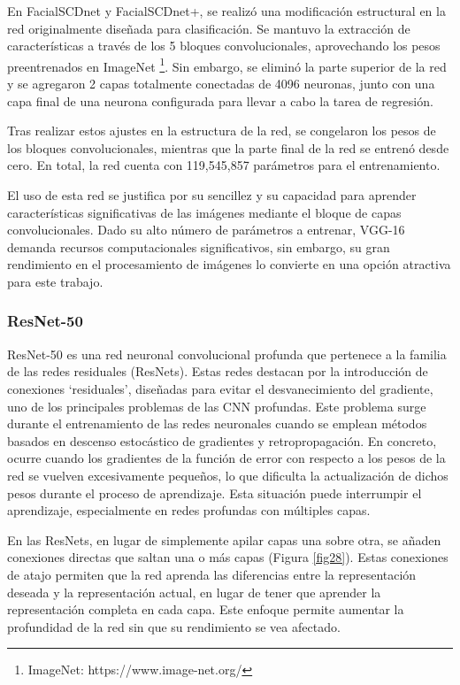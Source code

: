 En FacialSCDnet y FacialSCDnet+, se realizó una modificación estructural en la red originalmente diseñada para clasificación. Se mantuvo la extracción de características a través de los 5 bloques convolucionales, aprovechando los pesos preentrenados en ImageNet \footnote{ImageNet: https://www.image-net.org/}. Sin embargo, se eliminó la parte superior de la red y se agregaron 2 capas totalmente conectadas de 4096 neuronas, junto con una capa final de una neurona configurada para llevar a cabo la tarea de regresión.

Tras realizar estos ajustes en la estructura de la red, se congelaron los pesos de los bloques convolucionales, mientras que la parte final de la red se entrenó desde cero. En total, la red cuenta con 119,545,857 parámetros para el entrenamiento.

El uso de esta red se justifica por su sencillez y su capacidad para aprender características significativas de las imágenes mediante el bloque de capas convolucionales. Dado su alto número de parámetros a entrenar, VGG-16 demanda recursos computacionales significativos, sin embargo, su gran rendimiento en el procesamiento de imágenes lo convierte en una opción atractiva para este trabajo.

\subsubsection{ResNet-50}

ResNet-50 es una red neuronal convolucional profunda que pertenece a la familia de las redes residuales \cite{72} (ResNets). Estas redes destacan por la introducción de conexiones \enquote*{residuales}, diseñadas para evitar el desvanecimiento del gradiente, uno de los principales problemas de las CNN profundas.
Este problema surge durante el entrenamiento de las redes neuronales cuando se emplean métodos basados en descenso estocástico de gradientes y retropropagación. En concreto, ocurre cuando los gradientes de la función de error con respecto a los pesos de la red se vuelven excesivamente pequeños, lo que dificulta la actualización de dichos pesos durante el proceso de aprendizaje. Esta situación puede interrumpir el aprendizaje, especialmente en redes profundas con múltiples capas.

En las ResNets, en lugar de simplemente apilar capas una sobre otra, se añaden conexiones directas que saltan una o más capas (Figura \ref{fig28}). Estas conexiones de atajo permiten que la red aprenda las diferencias entre la representación deseada y la representación actual, en lugar de tener que aprender la representación completa en cada capa. Este enfoque permite aumentar la profundidad de la red sin que su rendimiento se vea afectado.

